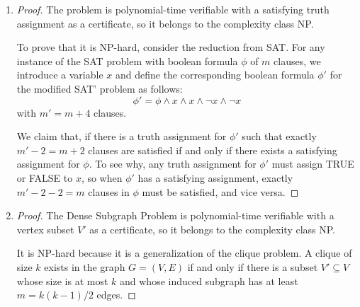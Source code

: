 \documentclass{article}
\begin{document}
\begin{enumerate}
\begin{proof}
        When $\phi'$ has a satisfying assignment, $x$ must be TRUE. Otherwise, the $(15q - k)$ $A$ clauses would not be satisfied. All the remaining $(k + q)$ clauses account for less than $15k'/16 = 15q$ clauses, as proved below:
        \begin{align*}
            k + q &= 15q + k - 14q\\
            &= 15q + k - 14\left(\left\lfloor\frac{k}{14}\right\rfloor + 1\right)\\
            &= 15q - 14\left(\left\lfloor\frac{k}{14}\right\rfloor + 1 - \frac{k}{14}\right)\\
            &\le 15q,
        \end{align*}
        contradicting the existence of a satisfying assignment for $\phi'$.
        Because $x$ must be TRUE when there exists a assignment that satisfies at least $15k'/16$ clauses, and the $q$ $A_\textrm{neg}$ clauses are all FALSE when $x$ is TRUE, the boolean formula $\phi$ and the $15q - k$ $A$ clauses must be all satisfied, demonstrating the existence of a satisfying assignment for $\phi$.
    \end{proof}
    \item \begin{proof}
        The problem is polynomial-time verifiable with a satisfying truth assignment as a certificate, so it belongs to the complexity class NP.

        To prove that it is NP-hard, consider the reduction from SAT. For any instance of the SAT problem with boolean formula $\phi$ of $m$ clauses, we introduce a variable $x$ and define the corresponding boolean formula $\phi'$ for the modified SAT' problem as follows:
        \[
            \phi' = \phi \land x \land x \land \neg x \land \neg x
        \]
        with $m' = m + 4$ clauses.
        
        We claim that, if there is a truth assignment for $\phi'$ such that exactly $m' - 2 = m + 2$ clauses are satisfied if and only if there exists a satisfying assignment for $\phi$. To see why, any truth assignment for $\phi'$ must assign TRUE or FALSE to $x$, so when $\phi'$ has a satisfying assignment, exactly $m' - 2 - 2 = m$ clauses in $\phi$ must be satisfied, and vice versa.
    \end{proof}

    \item \begin{proof}
        The Dense Subgraph Problem is polynomial-time verifiable with a vertex subset $V'$ as a certificate, so it belongs to the complexity class NP.

        It is NP-hard because it is a generalization of the clique problem. A clique of size $k$ exists in the graph $G = (V, E)$ if and only if there is a subset $V' \subseteq V$ whose size is at most $k$ and whose induced subgraph has at least $m = k(k - 1)/2$ edges.
    \end{proof}
\end{enumerate}
\end{document}
